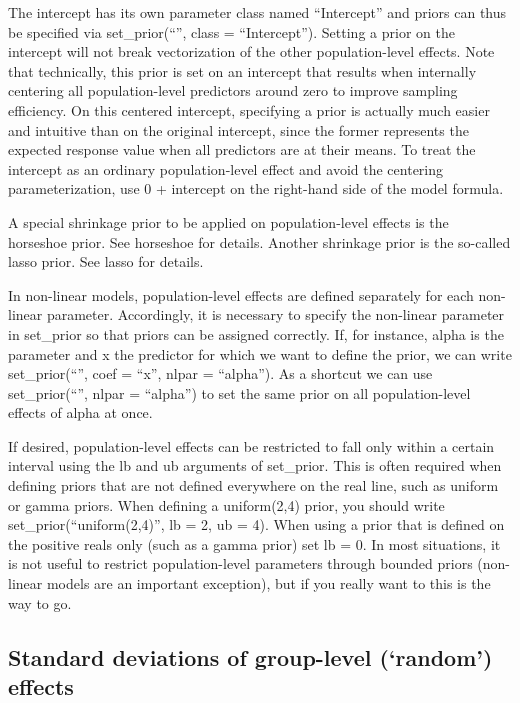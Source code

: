\documentclass[]{book}
\begin{document}
The intercept has its own parameter class named ``Intercept'' and priors
can thus be specified via set\_prior(``'', class = ``Intercept'').
Setting a prior on the intercept will not break vectorization of the
other population-level effects. Note that technically, this prior is set
on an intercept that results when internally centering all
population-level predictors around zero to improve sampling efficiency.
On this centered intercept, specifying a prior is actually much easier
and intuitive than on the original intercept, since the former
represents the expected response value when all predictors are at their
means. To treat the intercept as an ordinary population-level effect and
avoid the centering parameterization, use 0 + intercept on the
right-hand side of the model formula.

A special shrinkage prior to be applied on population-level effects is
the horseshoe prior. See horseshoe for details. Another shrinkage prior
is the so-called lasso prior. See lasso for details.

In non-linear models, population-level effects are defined separately
for each non-linear parameter. Accordingly, it is necessary to specify
the non-linear parameter in set\_prior so that priors can be assigned
correctly. If, for instance, alpha is the parameter and x the predictor
for which we want to define the prior, we can write set\_prior(``'',
coef = ``x'', nlpar = ``alpha''). As a shortcut we can use
set\_prior(``'', nlpar = ``alpha'') to set the same prior on all
population-level effects of alpha at once.

If desired, population-level effects can be restricted to fall only
within a certain interval using the lb and ub arguments of set\_prior.
This is often required when defining priors that are not defined
everywhere on the real line, such as uniform or gamma priors. When
defining a uniform(2,4) prior, you should write
set\_prior(``uniform(2,4)'', lb = 2, ub = 4). When using a prior that is
defined on the positive reals only (such as a gamma prior) set lb = 0.
In most situations, it is not useful to restrict population-level
parameters through bounded priors (non-linear models are an important
exception), but if you really want to this is the way to go.

\subsection{\texorpdfstring{Standard deviations of group-level
(`random')
effects}{Standard deviations of group-level (random) effects}}\label{standard-deviations-of-group-level-random-effects}
\end{document}

